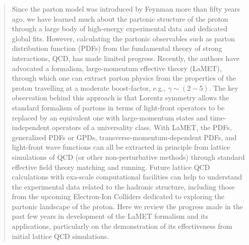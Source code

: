 \documentclass[aps,rmp,reprint,amsmath,amssymb,graphicx,longbibliography]{revtex4-1} %
\begin{document}
\begin{abstract}
Since the parton model was introduced by Feynman more than fifty years ago,
we have learned much about the partonic structure of the proton through a
large body of high-energy experimental data and dedicated global fits. However,
calculating the partonic observables such as parton distribution function (PDFs)
from the fundamental theory of strong interactions, QCD, has made limited
progress. Recently, the authors have advocated a formalism, large-momentum effective theory (LaMET),
through which one can extract parton physics from the properties of the proton
travelling at a moderate boost-factor, e.g., $\gamma\sim (2-5)$.
The key observation behind this approach is that Lorentz symmetry allows the standard
formalism of partons in terms of light-front operators to be replaced by
an equivalent one with large-momentum states and time-independent operators of
a universality class. With LaMET, the PDFs, generalized PDFs or GPDs,
transverse-momentum-dependent PDFs, and light-front wave functions
can all be extracted in principle from lattice simulations of
QCD (or other non-perturbative methods) through standard effective field theory matching
and running. Future lattice QCD calculations with exa-scale computational
facilities can help to understand the experimental data related to the
hadronic structure, including those from the upcoming Electron-Ion Colliders
dedicated to exploring the partonic landscape of the proton. Here we review the progress
made in the past few years in development of the LaMET formalism and its applications,
particularly on the demonstration of its effectiveness from initial lattice QCD simulations.
\end{abstract}
\maketitle

\tableofcontents{}

\end{document}
